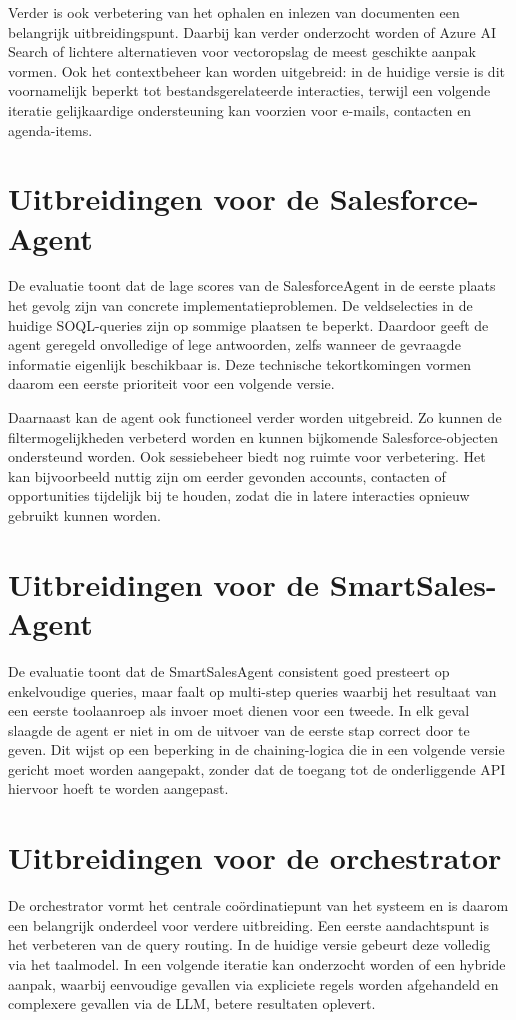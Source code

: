 Verder is ook verbetering van het ophalen en inlezen van documenten een belangrijk uitbreidingspunt. Daarbij kan verder onderzocht worden of Azure AI Search of lichtere alternatieven voor vectoropslag de meest geschikte aanpak vormen. Ook het contextbeheer kan worden uitgebreid: in de huidige versie is dit voornamelijk beperkt tot bestandsgerelateerde interacties, terwijl een volgende iteratie gelijkaardige ondersteuning kan voorzien voor e-mails, contacten en agenda-items.

\section{Uitbreidingen voor de Salesforce-Agent}
\label{sec:uitbreidingen-salesforce-agent}

De evaluatie toont dat de lage scores van de SalesforceAgent in de eerste plaats het gevolg zijn van concrete implementatieproblemen. De veldselecties in de huidige SOQL-queries zijn op sommige plaatsen te beperkt. Daardoor geeft de agent geregeld onvolledige of lege antwoorden, zelfs wanneer de gevraagde informatie eigenlijk beschikbaar is. Deze technische tekortkomingen vormen daarom een eerste prioriteit voor een volgende versie.

Daarnaast kan de agent ook functioneel verder worden uitgebreid. Zo kunnen de filtermogelijkheden verbeterd worden en kunnen bijkomende Salesforce-objecten ondersteund worden. Ook sessiebeheer biedt nog ruimte voor verbetering. Het kan bijvoorbeeld nuttig zijn om eerder gevonden accounts, contacten of opportunities tijdelijk bij te houden, zodat die in latere interacties opnieuw gebruikt kunnen worden.

\section{Uitbreidingen voor de SmartSales-Agent}
\label{sec:Uitbreidingen voor de SmartSales-agent}
De evaluatie toont dat de SmartSalesAgent consistent goed presteert op enkelvoudige queries, maar faalt op multi-step queries waarbij het resultaat van een eerste toolaanroep als invoer moet dienen voor een tweede. In elk geval slaagde de agent er niet in om de uitvoer van de eerste stap correct door te geven. Dit wijst op een beperking in de chaining-logica die in een volgende versie gericht moet worden aangepakt, zonder dat de toegang tot de onderliggende \gls{API} hiervoor hoeft te worden aangepast.

\section{Uitbreidingen voor de orchestrator}
\label{sec:Uitbreidingen voor de orchestrator}
De orchestrator vormt het centrale coördinatiepunt van het systeem en is daarom een belangrijk onderdeel voor verdere uitbreiding. Een eerste aandachtspunt is het verbeteren van de query routing. In de huidige versie gebeurt deze volledig via het taalmodel. In een volgende iteratie kan onderzocht worden of een hybride aanpak, waarbij eenvoudige gevallen via expliciete regels worden afgehandeld en complexere gevallen via de \gls{LLM}, betere resultaten oplevert.

